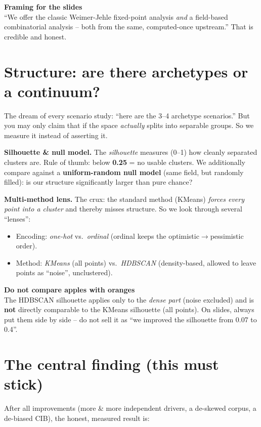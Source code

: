 \documentclass[11pt,a4paper]{article}
\newcommand{\callout}[3]{\par\smallskip\noindent
  \colorbox{#1}{\parbox{\dimexpr\linewidth-2\fboxsep\relax}{%
  \textbf{#2}\\[2pt]#3}}\par\smallskip}
\newcommand{\warnb}[2]{\callout{warnbg}{#1}{#2}}
\newcommand{\tipb}[2]{\callout{tipbg}{#1}{#2}}
\begin{document}
\tipb{Framing for the slides}{\enquote{We offer the classic Weimer-Jehle fixed-point analysis \emph{and} a
field-based combinatorial analysis -- both from the same, computed-once upstream.} That is credible and
honest.}

\section{Structure: are there archetypes or a continuum?}\label{sec:structure}

The dream of every scenario study: \enquote{here are the 3--4 archetype scenarios.} But you may only claim
that if the space \emph{actually} splits into separable groups. So we measure it instead of asserting it.

\textbf{Silhouette \& null model.} The \emph{silhouette} measures (0--1) how cleanly separated clusters
are. Rule of thumb: below \textbf{0.25} = no usable clusters. We additionally compare against a
\textbf{uniform-random null model} (same field, but randomly filled): is our structure significantly
larger than pure chance?

\textbf{Multi-method lens.} The crux: the standard method (KMeans) \emph{forces every point into a cluster}
and thereby misses structure. So we look through several \enquote{lenses}:
\begin{itemize}
  \item Encoding: \emph{one-hot} vs.\ \emph{ordinal} (ordinal keeps the optimistic$\to$pessimistic order).
  \item Method: \emph{KMeans} (all points) vs.\ \emph{HDBSCAN} (density-based, allowed to leave points as
  \enquote{noise}, unclustered).
\end{itemize}

\warnb{Do not compare apples with oranges}{The HDBSCAN silhouette applies only to the \emph{dense part}
(noise excluded) and is \textbf{not} directly comparable to the KMeans silhouette (all points). On slides,
always put them side by side -- do not sell it as \enquote{we improved the silhouette from 0.07 to 0.4}.}

\section{The central finding (this must stick)}

After all improvements (more \& more independent drivers, a de-skewed corpus, a de-biased CIB), the honest,
measured result is:
\end{document}
